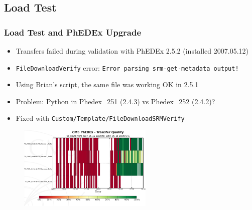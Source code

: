 \documentclass{beamer}
\begin{document}
\subsection{Load Test}
\begin{frame}
\frametitle{Load Test and PhEDEx Upgrade}
\begin{itemize}
    \item Transfers failed during validation with PhEDEx 2.5.2 (installed 2007.05.12)
    \item {\tt FileDownloadVerify} error: {\tt Error parsing srm-get-metadata output!}
    \item Using Brian's script, the same file was working OK in 2.5.1
    \item Problem: Python in Phedex\_251 (2.4.3) vs Phedex\_252 (2.4.2)?
    \item Fixed with {\tt Custom/Template/FileDownloadSRMVerify}
\end{itemize}

\begin{figure}
    \includegraphics*[height=4cm]{Graphics/phedex_252_wisc_quality.png}
\end{figure}

\end{frame}
\end{document}
